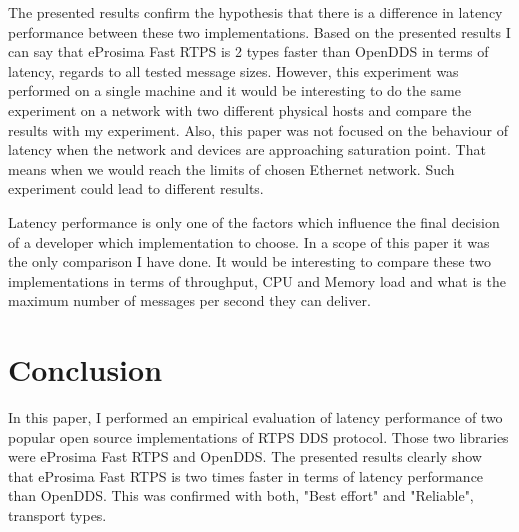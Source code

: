 \documentclass{csfourzero}
\begin{document}
\quad The presented results confirm the hypothesis that there is a difference in latency performance between these two implementations. Based on the presented results I can say that eProsima Fast RTPS is 2 types faster than OpenDDS in terms of latency, regards to all tested message sizes. However, this experiment was performed on a single machine and it would be interesting to do the same experiment on a network with two different physical hosts and compare the results with my experiment. Also, this paper was not focused on the behaviour of latency when the network and devices are approaching saturation point. That means when we would reach the limits of chosen Ethernet network. Such experiment could lead to different results. 

Latency performance is only one of the factors which influence the final decision of a developer which implementation to choose. In a scope of this paper it was the only comparison I have done. It would be interesting to compare these two implementations in terms of throughput, CPU and Memory load and what is the maximum number of messages per second they can deliver. 

\section{Conclusion}
\label{sec:conc}

\quad In this paper, I performed an empirical evaluation of latency performance of two popular open source implementations of RTPS DDS protocol. Those two libraries were eProsima Fast RTPS and OpenDDS. The presented results clearly show that eProsima Fast RTPS is two times faster in terms of latency performance than OpenDDS. This was confirmed with both, "Best effort" and "Reliable", transport types.


\end{document}
